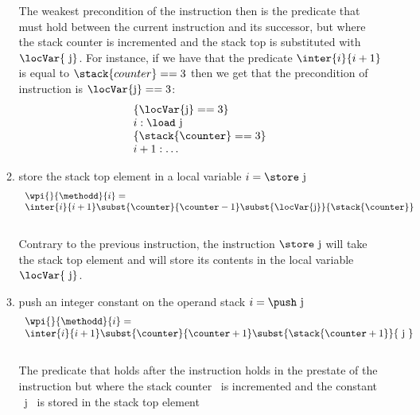 \begin{itemize}
\begin{enumerate}
                The weakest precondition of the instruction then is the predicate that must hold between the current instruction
                and its successor, but where the stack counter is incremented and the stack top is substituted with $\locVar{\mbox{ \rm j}}$.
                For instance, if we have that the predicate $\inter{i}{i+1} $ is equal to $ \stack{counter} == 3$ then we get that the precondition of
                instruction is $\locVar{\mbox{\rm j}} == 3$:               
		$$
		\begin{array}{l}
		    \{  \locVar{\mbox{\rm j}} == 3 \} \\
		     i:  \load  \ \mbox{\rm j} \\
                     \{ \stack{\counter} == 3 \} \\
                     i+1: \ldots 
		 \end{array}
		$$
 		
		\item store the stack top element in a local variable $ i= \store \ \mbox{\rm j} $	 \\	 
		$$ \begin{array}{l}
                          \wpi{  } { \methodd}{i}  =   \\ 
		\inter{i}{i+1}
                                    \subst{\counter}{\counter   - 1} 
				    \subst{\locVar{\mbox{\rm j}} }{\stack{ \counter}}  
			       
                   \end{array} $$ \\
		  
		  Contrary to the previous instruction, the instruction $\store \ \mbox{\rm j}$ will take the stack top element
		  and will store its contents in the local variable $\locVar{\mbox{ \rm j}}$.

		\item push an integer constant on the operand stack $ i= \push \  \mbox{\rm j} $ \\
			$$\begin{array}{l}
                          \wpi{  }  {\methodd} {i} =   \\
			  \inter{i}{i+1}
                                    \subst{\counter}{ \counter   + 1}
                                    \subst{\stack{ \counter +1 }}{ \mbox{ \rm j }}
			         		
			\end{array} $$ \\
		   The predicate that holds after the instruction holds in the prestate of the instruction but where the stack counter \counter \
		   is incremented and the constant \mbox{ \rm j } is stored in the stack top element
	

\end{enumerate}
\end{itemize}
